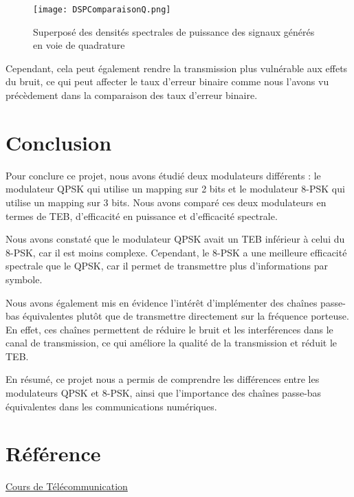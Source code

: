 \documentclass[11pt]{article}
\begin{document}
\begin{figure}[ht!]
    \centering
    \texttt{[image: DSPComparaisonQ.png]}
    \caption{Superposé des densités spectrales de puissance des signaux générés en voie de quadrature \label{fig : ComparQuadra}}
\end{figure}

Cependant, cela peut également rendre la transmission plus vulnérable aux effets du bruit, ce qui peut affecter le taux d'erreur binaire comme nous l'avons vu précèdement dans la comparaison des taux d'erreur binaire.
\clearpage
\section{Conclusion}
Pour conclure ce projet, nous avons étudié deux modulateurs différents : le modulateur QPSK qui utilise un mapping sur 2 bits et le modulateur 8-PSK qui utilise un mapping sur 3 bits. Nous avons comparé ces deux modulateurs en termes de TEB, d'efficacité en puissance et d'efficacité spectrale.

Nous avons constaté que le modulateur QPSK avait un TEB inférieur à celui du 8-PSK, car il est moins complexe. Cependant, le 8-PSK a une meilleure efficacité spectrale que le QPSK, car il permet de transmettre plus d'informations par symbole.

Nous avons également mis en évidence l'intérêt d'implémenter des chaînes passe-bas équivalentes plutôt que de transmettre directement sur la fréquence porteuse. En effet, ces chaînes permettent de réduire le bruit et les interférences dans le canal de transmission, ce qui améliore la qualité de la transmission et réduit le TEB.

En résumé, ce projet nous a permis de comprendre les différences entre les modulateurs QPSK et 8-PSK, ainsi que l'importance des chaînes passe-bas équivalentes dans les communications numériques.

\section{Référence}
\href{https://moodle-n7.inp-toulouse.fr/course/view.php?id=2014}{Cours de Télécommunication}
\end{document}
